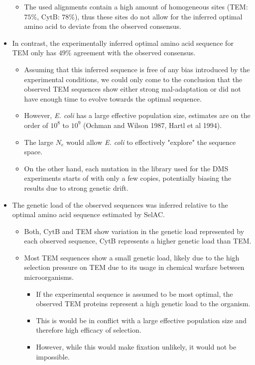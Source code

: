 \documentclass[12pt]{article}
\begin{document}
\begin{itemize}
\begin{itemize}
		\item The used alignments contain a high amount of homogeneous sites (TEM: $ 75 \%$, CytB: $78 \%$), thus these sites do not allow for the inferred optimal amino acid to deviate from the observed consensus.
	\end{itemize}
	\item In contrast, the experimentally inferred optimal amino acid sequence for TEM only has $49 \%$ agreement with the observed consensus.
	\begin{itemize}
		\item Assuming that this inferred sequence is free of any bias introduced by the experimental conditions, we could only come to the conclusion that the observed TEM sequences show either strong mal-adaptation or did not have enough time to evolve towards the optimal sequence.
		\item However, \textit{E. coli} has a large effective population size, estimates are on the order of $10^8$ to $10^9$ (Ochman and Wilson 1987, Hartl et al 1994).
		\item The large $N_e$ would allow \textit{E. coli} to effectively "explore" the sequence space.
		\item On the other hand, each mutation in the library used for the DMS experiments starts of with only a few copies, potentially biasing the results due to strong genetic drift.
	\end{itemize}
	\item The genetic load of the observed sequences was inferred relative to the optimal amino acid sequence estimated by SelAC.
	\begin{itemize}
		\item Both, CytB and TEM show variation in the genetic load represented by each observed sequence, CytB represents a higher genetic load than TEM.
		\item Most TEM sequences show a small genetic load, likely due to the high selection pressure on TEM due to its usage in chemical warfare between microorganisms.
		\begin{itemize}
			\item If the experimental sequence is assumed to be most optimal, the observed TEM proteins represent a high genetic load to the organism. 
			\item This is would be in conflict with a large effective population size and therefore high efficacy of selection.
			\item However, while this would make fixation unlikely, it would not be impossible.

\end{itemize}
\end{itemize}
\end{itemize}
\end{document}
